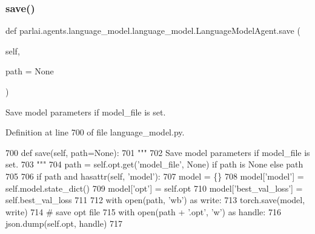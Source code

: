 \subsubsection{\texorpdfstring{save()}{save()}}
{\footnotesize\ttfamily def parlai.\+agents.\+language\+\_\+model.\+language\+\_\+model.\+Language\+Model\+Agent.\+save (\begin{DoxyParamCaption}\item[{}]{self,  }\item[{}]{path = {\ttfamily None} }\end{DoxyParamCaption})}

\begin{DoxyVerb}Save model parameters if model_file is set.
\end{DoxyVerb}
 

Definition at line 700 of file language\+\_\+model.\+py.


\begin{DoxyCode}
700     \textcolor{keyword}{def }save(self, path=None):
701         \textcolor{stringliteral}{"""}
702 \textcolor{stringliteral}{        Save model parameters if model\_file is set.}
703 \textcolor{stringliteral}{        """}
704         path = self.opt.get(\textcolor{stringliteral}{'model\_file'}, \textcolor{keywordtype}{None}) \textcolor{keywordflow}{if} path \textcolor{keywordflow}{is} \textcolor{keywordtype}{None} \textcolor{keywordflow}{else} path
705 
706         \textcolor{keywordflow}{if} path \textcolor{keywordflow}{and} hasattr(self, \textcolor{stringliteral}{'model'}):
707             model = \{\}
708             model[\textcolor{stringliteral}{'model'}] = self.model.state\_dict()
709             model[\textcolor{stringliteral}{'opt'}] = self.opt
710             model[\textcolor{stringliteral}{'best\_val\_loss'}] = self.best\_val\_loss
711 
712             with open(path, \textcolor{stringliteral}{'wb'}) \textcolor{keyword}{as} write:
713                 torch.save(model, write)
714             \textcolor{comment}{# save opt file}
715             with open(path + \textcolor{stringliteral}{'.opt'}, \textcolor{stringliteral}{'w'}) \textcolor{keyword}{as} handle:
716                 json.dump(self.opt, handle)
717 
\end{DoxyCode}
\mbox{\label{classparlai_1_1agents_1_1language__model_1_1language__model_1_1LanguageModelAgent_a9d871fa6c5da46d2fd5564b814001a97}} 
